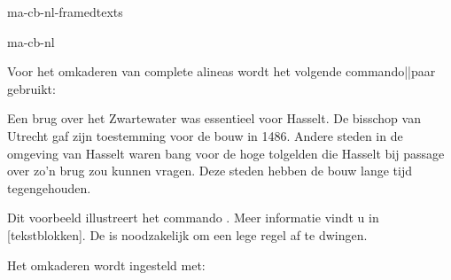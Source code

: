 \startonderdeel ma-cb-nl-framedtexts

\produkt ma-cb-nl




Voor het omkaderen van complete alineas wordt het volgende
commando||paar gebruikt:


\startbuffer
{}

\startkadertekst[breedte=.8\zetbreedte]
Een brug over het Zwartewater was essentieel voor Hasselt.
De bisschop van Utrecht gaf zijn toestemming voor de bouw
in 1486.
\blanko
Andere steden in de omgeving van Hasselt waren bang voor de
hoge tolgelden die Hasselt bij passage over zo'n brug zou
kunnen vragen. Deze steden hebben de bouw lange tijd
tegengehouden.
\stopkadertekst
\stopbuffer

\typebuffer

Dit voorbeeld illustreert het commando
. Meer informatie vindt u in
[tekstblokken]. De \type{\blanko} is
noodzakelijk om een lege regel af te dwingen.

\haalbuffer

Het omkaderen wordt ingesteld met:


\stoponderdeel
